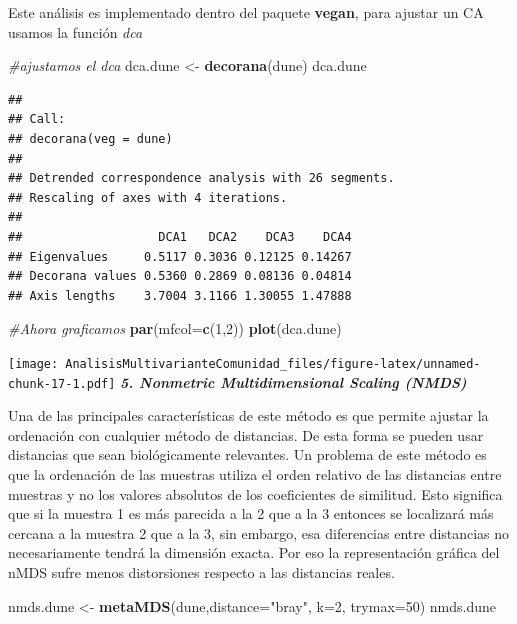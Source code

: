 \documentclass[]{book}
\newenvironment{Shaded}{\begin{snugshade}}{\end{snugshade}}
\newcommand{\KeywordTok}[1]{\textcolor[rgb]{0.13,0.29,0.53}{\textbf{{#1}}}}
\newcommand{\DataTypeTok}[1]{\textcolor[rgb]{0.13,0.29,0.53}{{#1}}}
\newcommand{\DecValTok}[1]{\textcolor[rgb]{0.00,0.00,0.81}{{#1}}}
\newcommand{\StringTok}[1]{\textcolor[rgb]{0.31,0.60,0.02}{{#1}}}
\newcommand{\CommentTok}[1]{\textcolor[rgb]{0.56,0.35,0.01}{\textit{{#1}}}}
\newcommand{\NormalTok}[1]{{#1}}
\begin{document}
Este análisis es implementado dentro del paquete \textbf{vegan}, para
ajustar un CA usamos la función \emph{dca}

\begin{Shaded}
\begin{Highlighting}[]
\CommentTok{#ajustamos el dca}
\NormalTok{dca.dune <-}\StringTok{ }\KeywordTok{decorana}\NormalTok{(dune)}
\NormalTok{dca.dune}
\end{Highlighting}
\end{Shaded}

\begin{verbatim}
## 
## Call:
## decorana(veg = dune) 
## 
## Detrended correspondence analysis with 26 segments.
## Rescaling of axes with 4 iterations.
## 
##                   DCA1   DCA2    DCA3    DCA4
## Eigenvalues     0.5117 0.3036 0.12125 0.14267
## Decorana values 0.5360 0.2869 0.08136 0.04814
## Axis lengths    3.7004 3.1166 1.30055 1.47888
\end{verbatim}

\begin{Shaded}
\begin{Highlighting}[]
\CommentTok{#Ahora graficamos}
\KeywordTok{par}\NormalTok{(}\DataTypeTok{mfcol=}\KeywordTok{c}\NormalTok{(}\DecValTok{1}\NormalTok{,}\DecValTok{2}\NormalTok{))}
\KeywordTok{plot}\NormalTok{(dca.dune)}
\end{Highlighting}
\end{Shaded}

\texttt{[image: AnalisisMultivarianteComunidad\_files/figure-latex/unnamed-chunk-17-1.pdf]}
\textbf{\emph{5. Nonmetric Multidimensional Scaling (NMDS)}}

Una de las principales características de este método es que permite
ajustar la ordenación con cualquier método de distancias. De esta forma
se pueden usar distancias que sean biológicamente relevantes. Un
problema de este método es que la ordenación de las muestras utiliza el
orden relativo de las distancias entre muestras y no los valores
absolutos de los coeficientes de similitud. Esto significa que si la
muestra 1 es más parecida a la 2 que a la 3 entonces se localizará más
cercana a la muestra 2 que a la 3, sin embargo, esa diferencias entre
distancias no necesariamente tendrá la dimensión exacta. Por eso la
representación gráfica del nMDS sufre menos distorsiones respecto a las
distancias reales.

\begin{Shaded}
\begin{Highlighting}[]
\NormalTok{nmds.dune <-}\StringTok{ }\KeywordTok{metaMDS}\NormalTok{(dune,}\DataTypeTok{distance=}\StringTok{"bray"}\NormalTok{, }\DataTypeTok{k=}\DecValTok{2}\NormalTok{, }\DataTypeTok{trymax=}\DecValTok{50}\NormalTok{)   }
\NormalTok{nmds.dune }
\end{Highlighting}
\end{Shaded}
\end{document}

